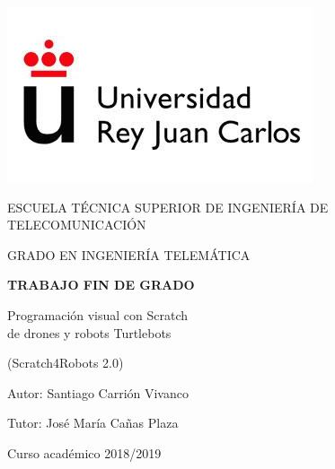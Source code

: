 \begin{titlepage}
	\begin{center}
		\vspace*{3mm}
		\begin{center}
			\includegraphics[width=0.4\linewidth]{img/urjc_logo.jpg}
		\end{center}
		\vspace{6.5mm}
		
		\fontsize{15.5}{14}\selectfont ESCUELA TÉCNICA SUPERIOR DE INGENIERÍA DE TELECOMUNICACIÓN
		\vspace{13mm}
		
		\fontsize{14}{14}\selectfont GRADO EN INGENIERÍA TELEMÁTICA
		
		\vspace{70pt}
		
		\fontsize{15.7}{14}\selectfont \textbf{TRABAJO FIN DE GRADO} 
		
		\vspace{15mm}
		\begin{huge}
			Programación visual con Scratch \\ de drones y robots Turtlebots
		\end{huge}
				\begin{huge}
							 (Scratch4Robots 2.0) 

						\end{huge}


		
		\vspace{15mm}
		
		\begin{large}
			Autor: Santiago Carrión Vivanco
			
			Tutor: José María Cañas Plaza
			
			\vspace{10mm}
		\end{large}
		\begin{normalsize}
			Curso académico 2018/2019		
		\end{normalsize}
		\vspace{10mm}
		
	\end{center}
	
\end{titlepage}
